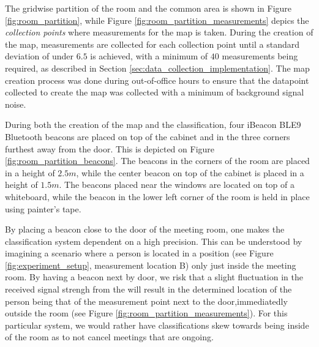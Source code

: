 The gridwise partition of the room and the common area is shown in Figure \ref{fig:room_partition}, while Figure \ref{fig:room_partition_measurements} depics the \textit{collection points} where measurements for the map is taken.
During the creation of the map, measurements are collected for each collection point until a standard deviation of under $6.5$  is achieved, with a minimum of $40$ measurements being required, as described in Section \ref{sec:data_collection_implementation}.
The map creation process was done during out-of-office hours to ensure that the datapoint collected to create the map was collected with a minimum of background signal noise.

During both the creation of the map and the classification, four iBeacon BLE9 Bluetooth beacons \cite{BluetoothiBeaconBLE9} are placed on top of the cabinet and in the three corners furthest away from the door. This is depicted on Figure \ref{fig:room_partition_beacons}.
The beacons in the corners of the room are placed in a height of $2.5m$, while the center beacon on top of the cabinet is placed in a height of $1.5m$.
The beacons placed near the windows are located on top of a whiteboard, while the beacon in the lower left corner of the room is held in place using painter's tape.

By placing a beacon close to the door of the meeting room, one makes the classification system dependent on a high precision.
This can be understood by imagining a scenario where a person is located in a position (see Figure \ref{fig:experiment_setup}, measurement location B) only just inside the meeting room.
By having a beacon next by door, we risk that a slight fluctuation in the received signal strengh from the will result in the determined location of the person being that of the measurement point next to the door,immediatedly outside the room (see Figure \ref{fig:room_partition_measurements}).
For this particular system, we would rather have classifications skew towards being inside of the room as to not cancel meetings that are ongoing.  





